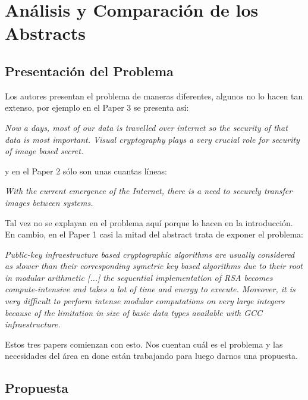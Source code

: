 \documentclass[a4paper,12pt]{article}
\begin{document}
\section{Análisis y Comparación de los Abstracts}

\subsection{Presentación del Problema}

Los autores presentan el problema de maneras diferentes, algunos no lo hacen tan extenso, por ejemplo en el Paper 3 se presenta así: \par
\textit{Now a days, most of our data is travelled over
internet so the security of that data is most important. Visual
cryptography plays a very crucial role for security of image
based secret.} \par
y en el Paper 2 sólo son unas cuantas líneas: \par
\textit{With the current emergence of the Internet,
there is a need to securely transfer images between
systems.} \par
Tal vez no se explayan en el problema aquí porque lo hacen en la introducción. En cambio, en el Paper 1 casi la mitad del 
abstract trata de exponer el problema: \par
\textit{Public-key infraestructure based cryptographic algorithms are
usually considered as slower than their corresponding symetric key
based algorithms due to their root in modular arithmetic [...] the sequential
implementation of RSA becomes compute-intensive and takes a lot of time and energy to execute.
Moreover, it is very difficult to perform intense modular computations on very
large integers because of the limitation in size of basic data types available with
GCC infraestructure.} \par

Estos tres papers comienzan con esto. Nos cuentan cuál es el problema y las necesidades del área en done están trabajando
para luego darnos una propuesta.

\subsection{Propuesta}
\end{document}
